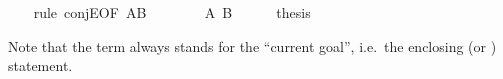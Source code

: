 \begin{isabellebody}
\ \ \isamarkupfalse%
\ {\isacharparenleft}rule\ conjE{\isacharbrackleft}OF\ AB{\isacharbrackright}{\isacharparenright}\ \ %
\isanewline
\ \ \ \ \isamarkupfalse%
\ {\isachardoublequoteopen}A{\isachardoublequoteclose}\ {\isachardoublequoteopen}B{\isachardoublequoteclose}\isanewline
\ \ \ \ \isamarkupfalse%
\ {\isacharquery}thesis\ \isacommand{{\isachardot}{\isachardot}}\isamarkupfalse%
\isanewline
\ \ \isamarkupfalse%
\isanewline
{}\isamarkupfalse%
%
\endisatagproof
{\isafoldproof}%
%
\isadelimproof
%
\endisadelimproof
%
\begin{isamarkuptext}%
\noindent Note that the term  always stands for the
``current goal'', i.e.\ the enclosing  (or
) statement.


\end{isamarkuptext}
\end{isabellebody}
